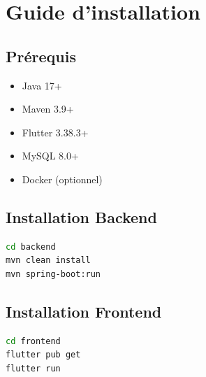 \documentclass[a4paper,11pt]{report}
\begin{document}

\chapter{Guide d'installation}

\section{Prérequis}
\begin{itemize}
    \item Java 17+
    \item Maven 3.9+
    \item Flutter 3.38.3+
    \item MySQL 8.0+
    \item Docker (optionnel)
\end{itemize}

\section{Installation Backend}
\begin{lstlisting}[language=bash, caption=Installation du backend]
cd backend
mvn clean install
mvn spring-boot:run
\end{lstlisting}

\section{Installation Frontend}
\begin{lstlisting}[language=bash, caption=Installation du frontend]
cd frontend
flutter pub get
flutter run
\end{lstlisting}

\end{document}
